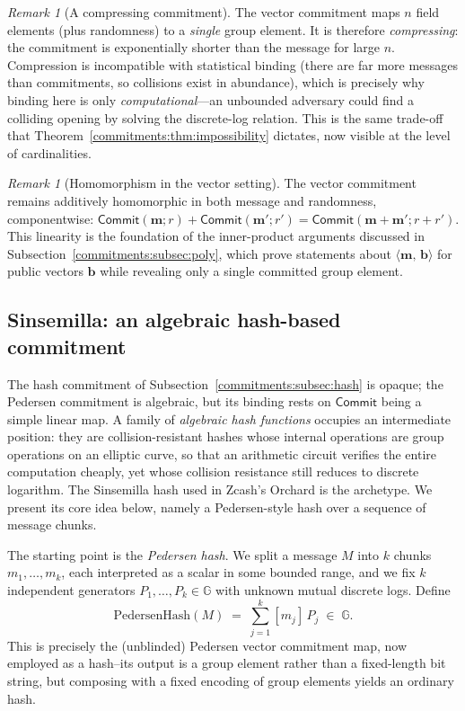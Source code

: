 \documentclass[11pt,a4paper]{article}
\theoremstyle{definition}
\theoremstyle{remark}
\newtheorem{remark}[theorem]{Remark}
\newcommand{\G}{\ensuremath{\mathbb{G}}}
\newcommand{\ip}[2]{\langle #1,\, #2 \rangle}
\begin{document}
\begin{remark}[A compressing commitment]\label{commitments:rem:compressing}
The vector commitment maps \(n\) field elements (plus randomness) to a \emph{single} group element. It is therefore \emph{compressing}: the commitment is exponentially shorter than the message for large \(n\). Compression is incompatible with statistical binding (there are far more messages than commitments, so collisions exist in abundance), which is precisely why binding here is only \emph{computational}---an unbounded adversary could find a colliding opening by solving the discrete-log relation. This is the same trade-off that Theorem~\ref{commitments:thm:impossibility} dictates, now visible at the level of cardinalities.
\end{remark}

\begin{remark}[Homomorphism in the vector setting]\label{commitments:rem:vector-homo}
The vector commitment remains additively homomorphic in both message and randomness, componentwise: \(\mathsf{Commit}(\mathbf{m}; r) + \mathsf{Commit}(\mathbf{m}'; r') = \mathsf{Commit}(\mathbf{m} + \mathbf{m}'; r + r')\). This linearity is the foundation of the inner-product arguments discussed in Subsection~\ref{commitments:subsec:poly}, which prove statements about \(\ip{\mathbf{m}}{\mathbf{b}}\) for public vectors \(\mathbf{b}\) while revealing only a single committed group element.
\end{remark}
\subsection{Sinsemilla: an algebraic hash-based commitment}\label{commitments:subsec:sinsemilla}

The hash commitment of Subsection~\ref{commitments:subsec:hash} is opaque; the Pedersen commitment is algebraic, but its binding rests on \(\mathsf{Commit}\) being a simple linear map. A family of \emph{algebraic hash functions} occupies an intermediate position: they are collision-resistant hashes whose internal operations are group operations on an elliptic curve, so that an arithmetic circuit verifies the entire computation cheaply, yet whose collision resistance still reduces to discrete logarithm. The Sinsemilla hash used in Zcash's Orchard is the archetype. We present its core idea below, namely a Pedersen-style hash over a sequence of message chunks.

The starting point is the \emph{Pedersen hash}. We split a message \(M\) into \(k\) chunks \(m_1, \dots, m_k\), each interpreted as a scalar in some bounded range, and we fix \(k\) independent generators \(P_1, \dots, P_k \in \G\) with unknown mutual discrete logs. Define
\[
  \mathrm{PedersenHash}(M) \;=\; \sum_{j=1}^{k} [m_j]\,P_j \;\in\; \G.
\]
This is precisely the (unblinded) Pedersen vector commitment map, now employed as a hash--its output is a group element rather than a fixed-length bit string, but composing with a fixed encoding of group elements yields an ordinary hash.
\end{document}
